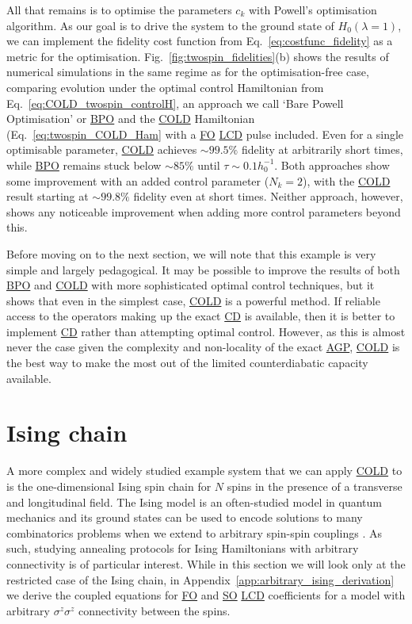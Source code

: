 \documentclass[a4paper,oneside,11pt]{book}
\newcommand{\sz}{\sigma^z}
\newcommand{\acrref}[1]{\hyperref[acr:#1]{#1}}
\begin{document}
All that remains is to optimise the parameters $c_k$ with Powell's optimisation algorithm. As our goal is to drive the system to the ground state of $H_0(\lambda = 1)$, we can implement the fidelity cost function from Eq.~\eqref{eq:costfunc_fidelity} as a metric for the optimisation. Fig.~\ref{fig:twospin_fidelities}(b) shows the results of numerical simulations in the same regime as for the optimisation-free case, comparing evolution under the optimal control Hamiltonian from Eq.~\eqref{eq:COLD_twospin_controlH}, an approach we call `Bare Powell Optimisation' or \acrref{BPO} and the \acrref{COLD} Hamiltonian (Eq.~\eqref{eq:twospin_COLD_Ham} with a \acrref{FO} \acrref{LCD} pulse included. Even for a single optimisable parameter, \acrref{COLD} achieves $\sim 99.5\%$ fidelity at arbitrarily short times, while \acrref{BPO} remains stuck below $\sim 85\%$ until $\tau \sim 0.1h_0^{-1}$. Both approaches show some improvement with an added control parameter ($N_k = 2$), with the \acrref{COLD} result starting at $\sim 99.8\%$ fidelity even at short times. Neither approach, however, shows any noticeable improvement when adding more control parameters beyond this. 

Before moving on to the next section, we will note that this example is very simple and largely pedagogical. It may be possible to improve the results of both \acrref{BPO} and \acrref{COLD} with more sophisticated optimal control techniques, but it shows that even in the simplest case, \acrref{COLD} is a powerful method. If reliable access to the operators making up the exact \acrref{CD} is available, then it is better to implement \acrref{CD} rather than attempting optimal control. However, as this is almost never the case given the complexity and non-locality of the exact \acrref{AGP}, \acrref{COLD} is the best way to make the most out of the limited counterdiabatic capacity available.

\section{Ising chain}\label{sec:5.2_Ising_chain}

A more complex and widely studied example system that we can apply \acrref{COLD} to is the one-dimensional Ising spin chain for $N$ spins in the presence of a transverse and longitudinal field. The Ising model is an often-studied model in quantum mechanics and its ground states can be used to encode solutions to many combinatorics problems when we extend to arbitrary spin-spin couplings \cite{mohseni_ising_2022, ebadi_quantum_2022, pichler_quantum_2018}. As such, studying annealing protocols for Ising Hamiltonians with arbitrary connectivity is of particular interest. While in this section we will look only at the restricted case of the Ising chain, in Appendix~\ref{app:arbitrary_ising_derivation} we derive the coupled equations for \acrref{FO} and \acrref{SO} \acrref{LCD} coefficients for a model with arbitrary $\sz\sz$ connectivity between the spins.
\end{document}
